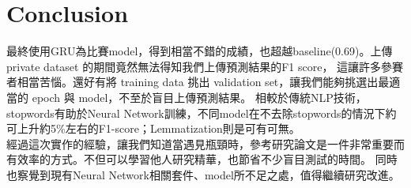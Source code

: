 \documentclass[8pt,a4paper]{article}
\begin{document}
\section*{Conclusion} 
\label{sec:Conclusion}

最終使用GRU為比賽model，得到相當不錯的成績，也超越baseline(0.69)。上傳 private dataset 的期間竟然無法得知我們上傳預測結果的F1 score，
這讓許多參賽者相當苦惱。還好有將 training data 挑出 validation set，讓我們能夠挑選出最適當的 epoch 與 model，不至於盲目上傳預測結果。
相較於傳統NLP技術，stopwords有助於Neural Network訓練，不同model在不去除stopwords的情況下約可上升約5\%左右的F1-score；Lemmatization則是可有可無。\\

經過這次實作的經驗，讓我們知道當遇見瓶頸時，參考研究論文是一件非常重要而有效率的方式。不但可以學習他人研究精華，也節省不少盲目測試的時間。
同時也察覺到現有Neural Network相關套件、model所不足之處，值得繼續研究改進。

 \label{sec:references}
\newpage
\end{document}

